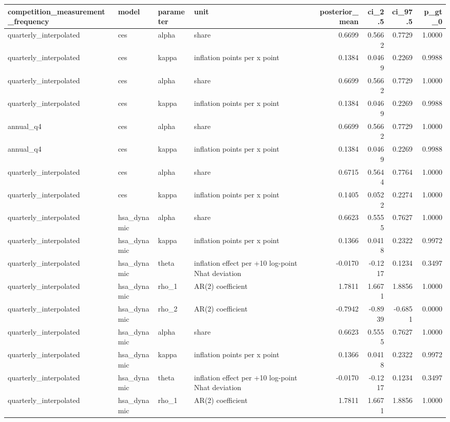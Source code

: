 \begin{tabular}{llllrrrr}
\toprule
competition\_measurement\_frequency & model & parameter & unit & posterior\_mean & ci\_2.5 & ci\_97.5 & p\_gt\_0 \\
\midrule
quarterly\_interpolated & ces & alpha & share & 0.6699 & 0.5662 & 0.7729 & 1.0000 \\
quarterly\_interpolated & ces & kappa & inflation points per x point & 0.1384 & 0.0469 & 0.2269 & 0.9988 \\
quarterly\_interpolated & ces & alpha & share & 0.6699 & 0.5662 & 0.7729 & 1.0000 \\
quarterly\_interpolated & ces & kappa & inflation points per x point & 0.1384 & 0.0469 & 0.2269 & 0.9988 \\
annual\_q4 & ces & alpha & share & 0.6699 & 0.5662 & 0.7729 & 1.0000 \\
annual\_q4 & ces & kappa & inflation points per x point & 0.1384 & 0.0469 & 0.2269 & 0.9988 \\
quarterly\_interpolated & ces & alpha & share & 0.6715 & 0.5644 & 0.7764 & 1.0000 \\
quarterly\_interpolated & ces & kappa & inflation points per x point & 0.1405 & 0.0522 & 0.2274 & 1.0000 \\
quarterly\_interpolated & hsa\_dynamic & alpha & share & 0.6623 & 0.5555 & 0.7627 & 1.0000 \\
quarterly\_interpolated & hsa\_dynamic & kappa & inflation points per x point & 0.1366 & 0.0418 & 0.2322 & 0.9972 \\
quarterly\_interpolated & hsa\_dynamic & theta & inflation effect per +10 log-point Nhat deviation & -0.0170 & -0.1217 & 0.1234 & 0.3497 \\
quarterly\_interpolated & hsa\_dynamic & rho\_1 & AR(2) coefficient & 1.7811 & 1.6671 & 1.8856 & 1.0000 \\
quarterly\_interpolated & hsa\_dynamic & rho\_2 & AR(2) coefficient & -0.7942 & -0.8939 & -0.6851 & 0.0000 \\
quarterly\_interpolated & hsa\_dynamic & alpha & share & 0.6623 & 0.5555 & 0.7627 & 1.0000 \\
quarterly\_interpolated & hsa\_dynamic & kappa & inflation points per x point & 0.1366 & 0.0418 & 0.2322 & 0.9972 \\
quarterly\_interpolated & hsa\_dynamic & theta & inflation effect per +10 log-point Nhat deviation & -0.0170 & -0.1217 & 0.1234 & 0.3497 \\
quarterly\_interpolated & hsa\_dynamic & rho\_1 & AR(2) coefficient & 1.7811 & 1.6671 & 1.8856 & 1.0000 \\

\end{tabular}
